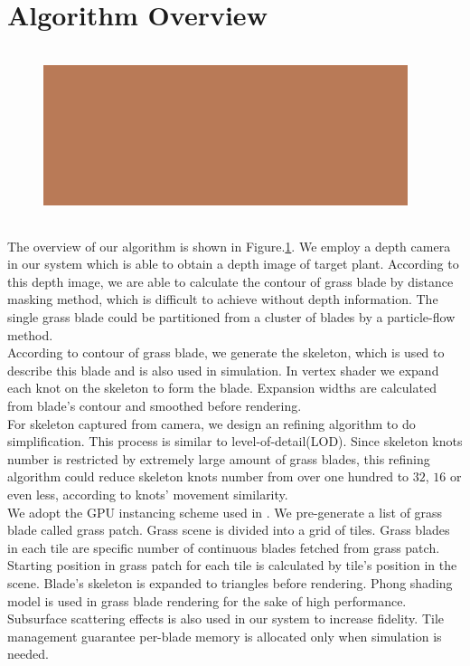 \documentclass[10pt,journal,compsoc]{IEEEtran}
\begin{document}
\section{Algorithm Overview}


\begin{figure}
    \centering
    \includegraphics[width=0.95\textwidth,height=5cm]{figs/test.jpg}
    \label{fig:overview}
\end{figure}

The overview of our algorithm is shown in Figure.\ref{fig:overview}. We employ a depth camera in our system which is able to obtain a depth image of target plant. According to this depth image, we are able to calculate the contour of grass blade by distance masking method, which is difficult to achieve without depth information. The single grass blade could be partitioned from a cluster of blades by a particle-flow method\cite{neubert2007approximate}.\\

According to contour of grass blade, we generate the skeleton, which is used to describe this blade and is also used in simulation. In vertex shader we expand each knot on the skeleton to form the blade. Expansion widths are calculated from blade's contour and smoothed before rendering.\\

For skeleton captured from camera, we design an refining algorithm to do simplification. This process is similar to level-of-detail(LOD). Since skeleton knots number is restricted by extremely large amount of grass blades, this refining algorithm could reduce skeleton knots number from over one hundred to $32$, $16$ or even less, according to knots' movement similarity.\\

We adopt the GPU instancing scheme used in \cite{fan2015simulation}. We pre-generate a list of grass blade called grass patch. Grass scene is divided into a grid of tiles. Grass blades in each tile are specific number of continuous blades fetched from grass patch. Starting position in grass patch for each tile is calculated by tile's position in the scene. Blade's skeleton is expanded to triangles before rendering. Phong shading model is used in grass blade rendering for the sake of high performance. Subsurface scattering effects is also used in our system to increase fidelity\cite{sousa2007vegetation}. Tile management guarantee per-blade memory is allocated only when simulation is needed.  \\
\end{document}
